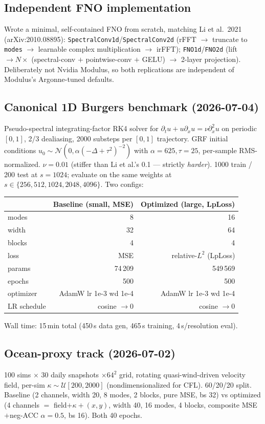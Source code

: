 \documentclass[11pt]{article}
\begin{document}
\subsection{Independent FNO implementation}
Wrote a minimal, self-contained FNO from scratch, matching Li et al.\ 2021
(arXiv:2010.08895): \texttt{SpectralConv1d}/\texttt{SpectralConv2d} (rFFT $\to$ truncate to
\texttt{modes} $\to$ learnable complex multiplication $\to$ irFFT); \texttt{FNO1d}/\texttt{FNO2d}
(lift $\to N \times$ (spectral-conv $+$ pointwise-conv $+$ GELU) $\to$ 2-layer projection).
Deliberately not Nvidia Modulus, so both replications are independent of Modulus's
Argonne-tuned defaults.

\subsection{Canonical 1D Burgers benchmark (2026-07-04)}
Pseudo-spectral integrating-factor RK4 solver for $\partial_t u + u\partial_x u = \nu\partial_x^2 u$
on periodic $[0,1]$, 2/3 dealiasing, 2000 substeps per $[0,1]$ trajectory. GRF initial conditions
$u_0\sim\mathcal{N}(0, \alpha(-\Delta+\tau^2)^{-2})$ with $\alpha=625, \tau=25$, per-sample
RMS-normalized. $\nu = 0.01$ (stiffer than Li et al.'s 0.1 --- strictly \emph{harder}).
1000 train / 200 test at $s=1024$; evaluate on the same weights at
$s\in\{256,512,1024,2048,4096\}$. Two configs:

\begin{center}
\begin{tabular}{lrr}
\toprule
 & Baseline (small, MSE) & Optimized (large, LpLoss) \\
\midrule
modes & 8 & 16 \\
width & 32 & 64 \\
blocks & 4 & 4 \\
loss & MSE & relative-$L^2$ (LpLoss) \\
params & 74\,209 & 549\,569 \\
epochs & 500 & 500 \\
optimizer & AdamW lr 1e-3 wd 1e-4 & AdamW lr 1e-3 wd 1e-4 \\
LR schedule & cosine $\to 0$ & cosine $\to 0$ \\
\bottomrule
\end{tabular}
\end{center}

Wall time: 15\,min total (450\,s data gen, 465\,s training, 4\,s/resolution eval).

\subsection{Ocean-proxy track (2026-07-02)}
100 sims $\times$ 30 daily snapshots $\times 64^2$ grid, rotating quasi-wind-driven velocity field,
per-sim $\kappa\sim\mathcal{U}[200,2000]$ (nondimensionalized for CFL). 60/20/20 split.
Baseline (2 channels, width 20, 8 modes, 2 blocks, pure MSE, bs 32) vs optimized
(4 channels $=$ field$+\kappa+(x,y)$, width 40, 16 modes, 4 blocks, composite MSE$+$neg-ACC
$\alpha=0.5$, bs 16). Both 40 epochs.
\end{document}
